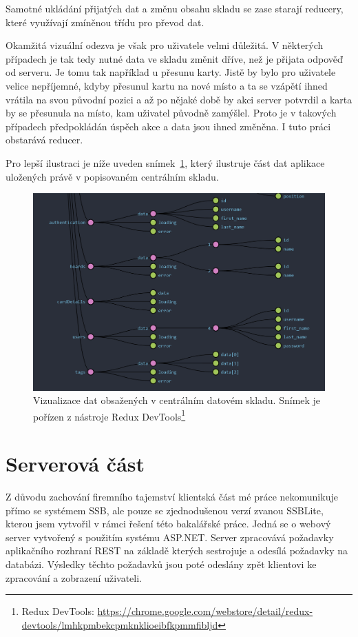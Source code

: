 Samotné ukládání přijatých dat a změnu obsahu skladu se zase starají reducery, které využívají zmíněnou třídu pro převod dat. 

Okamžitá vizuální odezva je však pro uživatele velmi důležitá. V některých případech je tak tedy nutné data ve skladu změnit dříve, než je přijata odpověď od serveru. Je tomu tak například u přesunu karty. Jistě by bylo pro uživatele velice nepříjemné, kdyby přesunul kartu na nové místo a ta se vzápětí ihned vrátila na svou původní pozici a až po nějaké době by akci server potvrdil a karta by se přesunula na místo, kam uživatel původně zamýšlel. Proto je v takových případech předpokládán úspěch akce a data jsou ihned změněna. I tuto práci obstarává reducer.

Pro lepší ilustraci je níže uveden snímek~\ref{img:ngrx-devtools}, který ilustruje část dat aplikace uložených právě v popisovaném centrálním skladu.

\begin{figure}[H]
	\centering
	\label{img:ngrx-devtools}
	\includegraphics[width=\textwidth]{obrazky-figures/ngrx-chart.png}
	\caption{Vizualizace dat obsažených v centrálním datovém skladu. Snímek je pořízen z nástroje Redux DevTools\footnote{Redux DevTools: \url{https://chrome.google.com/webstore/detail/redux-devtools/lmhkpmbekcpmknklioeibfkpmmfibljd}}}
\end{figure}



\section{Serverová část}
Z důvodu zachování firemního tajemství klientská část mé práce nekomunikuje přímo se systémem SSB, ale pouze se zjednodušenou verzí zvanou SSBLite, kterou jsem vytvořil v rámci řešení této bakalářské práce. Jedná se o webový server vytvořený s použitím systému ASP.NET. Server zpracovává požadavky aplikačního rozhraní REST na základě kterých sestrojuje a odesílá požadavky na databázi. Výsledky těchto požadavků jsou poté odeslány zpět klientovi ke zpracování a zobrazení uživateli.

